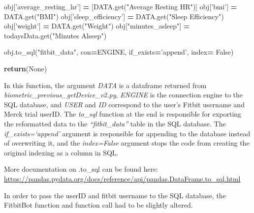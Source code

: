 \documentclass[]{book}
\newenvironment{Shaded}{\begin{snugshade}}{\end{snugshade}}
\newcommand{\ControlFlowTok}[1]{\textcolor[rgb]{0.13,0.29,0.53}{\textbf{#1}}}
\newcommand{\NormalTok}[1]{#1}
\newcommand{\OperatorTok}[1]{\textcolor[rgb]{0.81,0.36,0.00}{\textbf{#1}}}
\newcommand{\StringTok}[1]{\textcolor[rgb]{0.31,0.60,0.02}{#1}}
\newcommand{\VariableTok}[1]{\textcolor[rgb]{0.00,0.00,0.00}{#1}}
\begin{document}
\begin{Shaded}
\begin{Highlighting}[]
\NormalTok{    obj[}\StringTok{'average_resting_hr'}\NormalTok{] }\OperatorTok{=}\NormalTok{ [DATA.get(}\StringTok{"Average Resting HR"}\NormalTok{)]}
\NormalTok{    obj[}\StringTok{'bmi'}\NormalTok{] }\OperatorTok{=}\NormalTok{ DATA.get(}\StringTok{"BMI"}\NormalTok{)}
\NormalTok{    obj[}\StringTok{'sleep_efficiency'}\NormalTok{] }\OperatorTok{=}\NormalTok{ DATA.get(}\StringTok{"Sleep Efficiency"}\NormalTok{)}
\NormalTok{    obj[}\StringTok{'weight'}\NormalTok{] }\OperatorTok{=}\NormalTok{ DATA.get(}\StringTok{"Weight"}\NormalTok{)}
\NormalTok{    obj[}\StringTok{"minutes_asleep"}\NormalTok{] }\OperatorTok{=}\NormalTok{ todaysData.get(}\StringTok{"Minutes Alseep"}\NormalTok{)}
 
\NormalTok{    obj.to_sql(}\StringTok{"fitbit_data"}\NormalTok{, con}\OperatorTok{=}\NormalTok{ENGINE, if_exists}\OperatorTok{=}\StringTok{'append'}\NormalTok{, index}\OperatorTok{=} \VariableTok{False}\NormalTok{)}
   
    \ControlFlowTok{return}\NormalTok{(}\VariableTok{None}\NormalTok{)}
\end{Highlighting}
\end{Shaded}

In this function, the argument \emph{DATA} is a dataframe returned from \emph{biometric\_previous\_getDevice\_v2.py}, \emph{ENGINE} is the connection engine to the SQL database, and \emph{USER} and \emph{ID} correspond to the user's Fitbit username and Merck trial userID. The \emph{to\_sql} function at the end is responsible for exporting the reformatted data to the \emph{``fitbit\_data''} table in the SQL database. The \emph{if\_exists=`append'} argument is responsible for appending to the database instead of overwriting it, and the \emph{index=False} argument stops the code from creating the original indexing as a column in SQL.

More documentation on .to\_sql can be found here: \url{https://pandas.pydata.org/docs/reference/api/pandas.DataFrame.to_sql.html}

In order to pass the userID and fitbit username to the SQL database, the FitbitBot function and function call had to be slightly altered.
\end{document}

